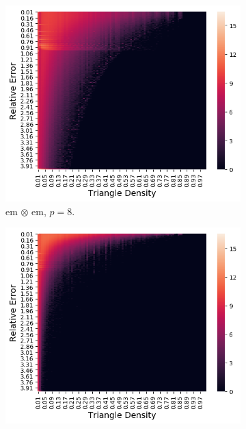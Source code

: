 \documentclass[10]{article}
\begin{document}
\begin{figure}
	\begin{center}
		\begin{subfigure}{0.32\linewidth}
			\centerline{\includegraphics[width=1.0\columnwidth]{em_x_em_edge_dist_p8}}
			\caption{em $\otimes$ em, $p=8$. \label{fig:em_x_em_edge_density_vs_rel_err_p8}}
		\end{subfigure}
		\begin{subfigure}{0.32\linewidth}
			\centerline{\includegraphics[width=1.0\columnwidth]{em_x_em_edge_dist_p12}}

\end{subfigure}
\end{center}
\end{figure}
\end{document}
